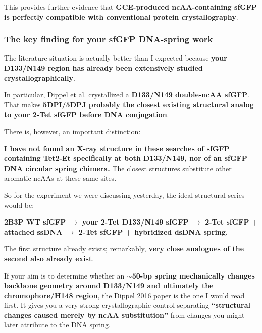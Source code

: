 \documentclass{article}
\begin{document}
This provides further evidence that \textbf{GCE-produced ncAA-containing sfGFP is perfectly compatible with conventional protein crystallography}.

\subsubsection*{The key finding for your sfGFP DNA-spring work}

The literature situation is actually better than I expected because \textbf{your D133/N149 region has already been extensively studied crystallographically}.

In particular, Dippel et al. crystallized a \textbf{D133/N149 double-ncAA sfGFP}. That makes \textbf{5DPI/5DPJ probably the closest existing structural analog to your 2-Tet sfGFP before DNA conjugation}. \href{https://www.rcsb.org/structure/5DPI}{\textbullet}

There is, however, an important distinction:

\textbf{I have not found an X-ray structure in these searches of sfGFP containing Tet2-Et specifically at both D133/N149, nor of an sfGFP--DNA circular spring chimera.} The closest structures substitute other aromatic ncAAs at these same sites.

So for the experiment we were discussing yesterday, the ideal structural series would be:

\textbf{2B3P WT sfGFP \(\rightarrow\) your 2-Tet D133/N149 sfGFP \(\rightarrow\) 2-Tet sfGFP + attached ssDNA \(\rightarrow\) 2-Tet sfGFP + hybridized dsDNA spring.}

The first structure already exists; remarkably, \textbf{very close analogues of the second also already exist}.

If your aim is to determine whether an \textbf{\(\sim\)50-bp spring mechanically changes backbone geometry around D133/N149 and ultimately the chromophore/H148 region}, the Dippel 2016 paper is the one I would read first. It gives you a very strong crystallographic control separating \textbf{``structural changes caused merely by ncAA substitution''} from changes you might later attribute to the DNA spring.

\printbibliography
\end{document}
